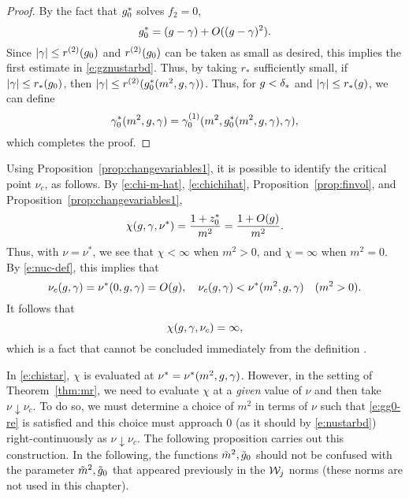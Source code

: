 \begin{proof}
By the fact that $g_0^*$ solves $f_2 = 0$,
\begin{equation}
g_0^* = (g - \gamma) + O((g - \gamma)^2).
\end{equation}
Since $|\gamma| \le r^{(2)}(g_0)$ and $r^{(2)}(g_0)$ can be taken
as small as desired, this implies the first estimate in \eqref{e:gznustarbd}.
Thus, by taking $r_*$ sufficiently small, if $|\gamma| \le r_*(g_0)$, then
$|\gamma| \le r^{(2)}(g_0^*(m^2, g, \gamma))$.
Thus, for $g < \delta_*$ and $|\gamma| \leq r_*(g)$,
we can define
\begin{equation}
\gamma_0^*(m^2, g, \gamma)
	=
\gamma^{(1)}_0(m^2, g_0^*(m^2, g, \gamma), \gamma),
\end{equation}
which completes the proof.
\end{proof}

Using Proposition~\ref{prop:changevariables1}, it is possible to
identify the critical point $\nu_c$, as follows.
By \eqref{e:chi-m-hat}, \eqref{e:chichihat}, Proposition~\ref{prop:finvol}, and Proposition~\ref{prop:changevariables1},
\begin{equation}
\label{e:chistar}
\chi(g, \gamma, \nu^*) = \frac{1 + z_0^*}{m^2} = \frac{1 + O(g)}{m^2}.
\end{equation}
Thus, with $\nu = \nu^*$, we see that $\chi < \infty$ when $m^2 > 0$, and
$\chi = \infty$ when $m^2 = 0$.
By \eqref{e:nuc-def}, this implies that
\begin{equation}
\label{e:nustarbd}
\nu_c(g, \gamma) = \nu^*(0, g, \gamma) = O(g),
	\quad
\nu_c(g, \gamma) < \nu^*(m^2, g, \gamma)
	\quad
(m^2 > 0).
\end{equation}
It follows that
\begin{equation}
\chi(g, \gamma, \nu_c) = \infty,
\end{equation}
which is a fact that cannot be concluded immediately from the definition .

In \eqref{e:chistar}, $\chi$ is evaluated at $\nu^* = \nu^*(m^2, g, \gamma)$.
However, in the setting of Theorem~\ref{thm:mr},
we need to evaluate $\chi$ at a \emph{given} value of $\nu$
and then take $\nu \downarrow \nu_c$.
To do so, we must determine a choice of $m^2$ in terms of $\nu$
such that \eqref{e:gg0-re} is satisfied and this choice
must approach $0$ (as it should by \eqref{e:nustarbd})
right-continuously as $\nu\downarrow\nu_c$.
The following proposition carries out this construction.
In the following, the functions $\tilde m^2, \tilde {g}_0$ should not be
confused with the parameter $\tilde{m}^2, \tilde{g}_0$ that appeared previously
in the $\mathcal{W}_j$ norms (these norms are not used in this chapter).

